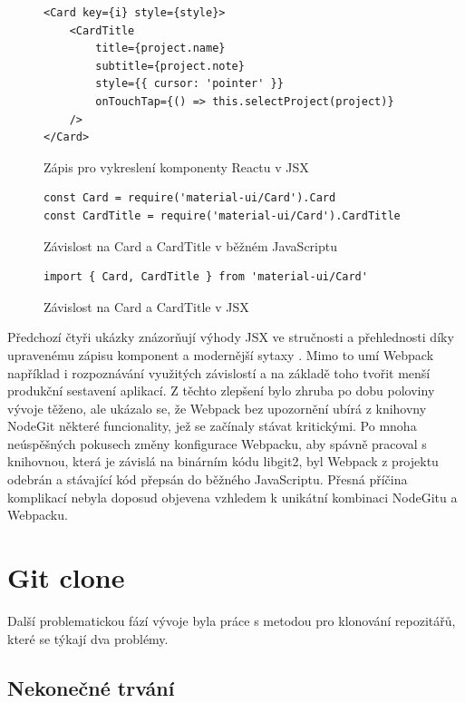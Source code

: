 \begin{figure}[h]
\begin{verbatim}
<Card key={i} style={style}>
	<CardTitle
		title={project.name}
		subtitle={project.note}
		style={{ cursor: 'pointer' }}
		onTouchTap={() => this.selectProject(project)}
	/>
</Card>
\end{verbatim}
\caption{Zápis pro vykreslení komponenty Reactu v JSX}
\end{figure}

\begin{figure}[h]
	\begin{verbatim}
const Card = require('material-ui/Card').Card
const CardTitle = require('material-ui/Card').CardTitle
	\end{verbatim}
	\caption{Závislost na Card a CardTitle v běžném JavaScriptu}
\end{figure}

\begin{figure}[h]
	\begin{verbatim}
import { Card, CardTitle } from 'material-ui/Card'
	\end{verbatim}
	\caption{Závislost na Card a CardTitle v JSX}
\end{figure}

\FloatBarrier

Předchozí čtyři ukázky znázorňují výhody JSX ve stručnosti a přehlednosti díky upravenému zápisu komponent a modernější sytaxy . Mimo to umí Webpack například i rozpoznávání využitých závislostí a na základě toho tvořit menší produkční sestavení aplikací. Z těchto zlepšení bylo zhruba po dobu poloviny vývoje těženo, ale ukázalo se, že Webpack bez upozornění ubírá z knihovny NodeGit některé funcionality, jež se začínaly stávat kritickými. Po mnoha neúspěšných pokusech změny konfigurace Webpacku, aby spávně pracoval s knihovnou, která je závislá na binárním kódu libgit2, byl Webpack z projektu odebrán a stávající kód přepsán do běžného JavaScriptu. Přesná příčina komplikací nebyla doposud objevena vzhledem k unikátní kombinaci NodeGitu a Webpacku.

\section{Git clone}

Další problematickou fází vývoje byla práce s metodou pro klonování repozitářů, které se týkají dva problémy.

\subsection{Nekonečné trvání}

